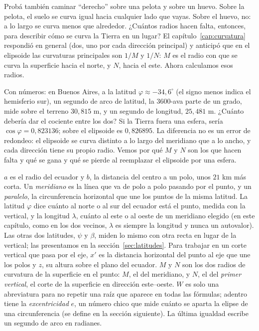 Probá también caminar \enquote{derecho} sobre una pelota y sobre un huevo. Sobre la pelota, el
suelo se curva igual hacia cualquier lado que vayas. Sobre el huevo, no: a lo largo se curva
menos que alrededor. ¿Cuántos radios hacen falta, entonces, para describir cómo se curva la
Tierra en un lugar? El capítulo~\ref{cap:curvatura} respondió en general (dos, uno por cada
dirección principal) y anticipó que en el elipsoide las curvaturas principales son \(1/M\) y
\(1/N\): \(M\) es el radio con que se curva la superficie hacia el norte, y \(N\), hacia el
este. Ahora calculamos esos radios.

Con números: en Buenos Aires, a la latitud \(\varphi\approx-34{,}6^\circ\) (el signo menos
indica el hemisferio sur), un segundo de arco de latitud, la 3600-ava parte de un grado, mide
sobre el terreno \(30{,}815\) m, y un segundo de longitud, \(25{,}481\) m. ¿Cuánto debería dar
el cociente entre los dos? Si la Tierra fuera una esfera, sería \(\cos\varphi=0{,}823136\); sobre el elipsoide
es \(0{,}826895\). La diferencia no es un error de redondeo: el elipsoide se curva distinto
a lo largo del meridiano que a lo ancho, y cada dirección tiene su propio radio. Vemos por qué
\(M\) y \(N\) son los que hacen falta y qué se gana y qué se pierde al reemplazar el elipsoide
por una esfera.

\(a\) es el radio del ecuador y \(b\), la distancia del centro a un polo, unos
\(21\) km más corta. Un \emph{meridiano} es la línea que va de polo a polo pasando por el
punto, y un \emph{paralelo}, la circunferencia horizontal que une los puntos de la misma
latitud. La latitud \(\varphi\) dice cuánto al norte o al sur del ecuador está el punto, medida
con la vertical, y la longitud \(\lambda\), cuánto al este o al oeste de un meridiano elegido
(en este capítulo, como en los dos vecinos, \(\lambda\) es siempre la longitud y nunca un
autovalor). Las otras dos latitudes, \(\psi\) y \(\beta\), miden lo mismo con otra recta en
lugar de la vertical; las presentamos en la sección~\ref{sec:latitudes}. Para trabajar en un
corte vertical que pasa por el eje, \(x'\) es la distancia horizontal del punto al eje que une
los polos y \(z\), su altura sobre el plano del ecuador. \(M\) y \(N\) son los dos radios de
curvatura de la superficie en el punto: \(M\), el del meridiano, y \(N\), el del \emph{primer
vertical}, el corte de la superficie en dirección este--oeste. \(W\) es solo una abreviatura
para no repetir una raíz que aparece en todas las fórmulas; adentro tiene la
\emph{excentricidad} \(e\), un número chico que mide cuánto se aparta la elipse de una
circunferencia (se define en la sección siguiente). La última igualdad escribe un segundo de
arco en radianes.

